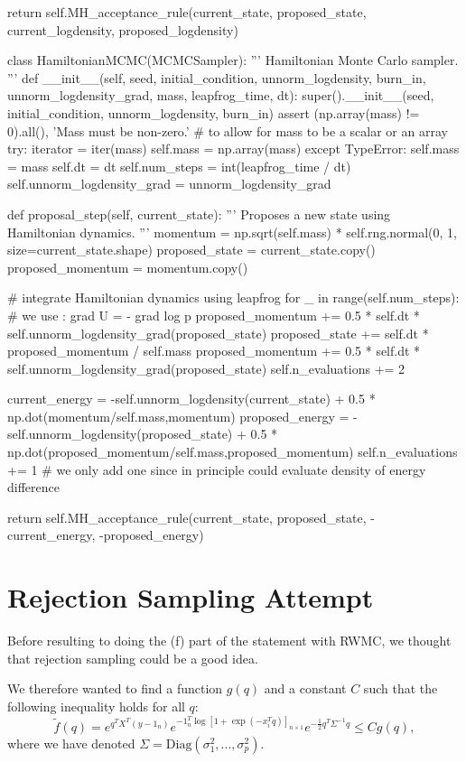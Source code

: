 \documentclass[a4paper, 12pt,oneside]{article}
\begin{document}
\begin{python}
					return self.MH_acceptance_rule(current_state, proposed_state, current_logdensity, proposed_logdensity)

			class HamiltonianMCMC(MCMCSampler):
				'''
				Hamiltonian Monte Carlo sampler.
				'''
				def __init__(self, seed, initial_condition, unnorm_logdensity, burn_in, unnorm_logdensity_grad, mass, leapfrog_time, dt):
					super().__init__(seed, initial_condition, unnorm_logdensity, burn_in)
					assert (np.array(mass) != 0).all(), 'Mass must be non-zero.'
					# to allow for mass to be a scalar or an array
					try:
						iterator = iter(mass)
						self.mass = np.array(mass)
					except TypeError:
						self.mass = mass
					self.dt = dt
					self.num_steps = int(leapfrog_time / dt)
					self.unnorm_logdensity_grad = unnorm_logdensity_grad
				
				def proposal_step(self, current_state):
					'''
					Proposes a new state using Hamiltonian dynamics.
					'''
					momentum = np.sqrt(self.mass) * self.rng.normal(0, 1, size=current_state.shape)
					proposed_state = current_state.copy()
					proposed_momentum = momentum.copy()
					
					# integrate Hamiltonian dynamics using leapfrog
					for _ in range(self.num_steps):
						# we use : grad U = - grad log p
						proposed_momentum += 0.5 * self.dt * self.unnorm_logdensity_grad(proposed_state) 
						proposed_state += self.dt * proposed_momentum / self.mass
						proposed_momentum += 0.5 * self.dt * self.unnorm_logdensity_grad(proposed_state)
						self.n_evaluations += 2

					current_energy = -self.unnorm_logdensity(current_state) + 0.5 * np.dot(momentum/self.mass,momentum)
					proposed_energy = -self.unnorm_logdensity(proposed_state) + 0.5 * np.dot(proposed_momentum/self.mass,proposed_momentum)
					self.n_evaluations += 1
					# we only add one since in principle could evaluate density of energy difference
					
					return self.MH_acceptance_rule(current_state, proposed_state, -current_energy, -proposed_energy)
		\end{python}
		\section{Rejection Sampling Attempt}\label{appendix:rejection-sampling-attempt}
		Before resulting to doing the (f) part of the statement with RWMC, we thought that rejection sampling could be a good idea. 
		
		We therefore wanted to find a function $g(q)$ and a constant $C$ such that the following inequality holds for all $q$:
		\begin{equation}
			\tilde{f}(q) = e^{q^TX^T(y-1_{n})}e^{-1_{n}^T \log[1+\exp(-x_i^Tq)]_{n\times 1}}e^{-\frac{1}{2}q^T\Sigma^{-1} q} \leq Cg(q),
		\end{equation}
		where we have denoted $\Sigma=\text{Diag}(\sigma_1^2,...,\sigma_p^2)$.
		
\end{document}
